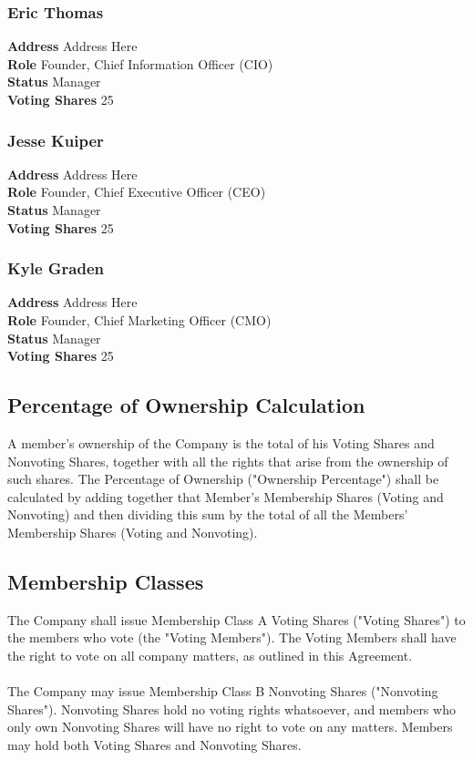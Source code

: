 \documentclass[11pt]{article}
\begin{document}
\subsubsection{Eric Thomas}
\textbf{Address} Address Here\\
\textbf{Role} Founder, Chief Information Officer (CIO)\\
\textbf{Status} Manager \\
\textbf{Voting Shares} 25

\subsubsection{Jesse Kuiper}
\textbf{Address} Address Here\\
\textbf{Role} Founder, Chief Executive Officer (CEO)\\
\textbf{Status} Manager \\
\textbf{Voting Shares} 25

\subsubsection{Kyle Graden}
\textbf{Address} Address Here\\
\textbf{Role} Founder, Chief Marketing Officer (CMO)\\
\textbf{Status} Manager \\
\textbf{Voting Shares} 25

\subsection{Percentage of Ownership Calculation}
A member's ownership of the Company is the total of his Voting Shares and Nonvoting Shares, together with all the rights that arise from the ownership of such shares. The Percentage of Ownership ("Ownership Percentage") shall be calculated by adding together that Member's Membership Shares (Voting and Nonvoting) and then dividing this sum by the total of all the Members' Membership Shares (Voting and Nonvoting).

\subsection{Membership Classes}
\label{sec:membershipClasses}
The Company shall issue Membership Class A Voting Shares ("Voting Shares") to the members who vote (the "Voting Members"). The Voting Members shall have the right to vote on all company matters, as outlined in this Agreement.\\\\
The Company may issue Membership Class B Nonvoting Shares ("Nonvoting Shares"). Nonvoting Shares hold no voting rights whatsoever, and members who only own Nonvoting Shares will have no right to vote on any matters. Members may hold both Voting Shares and Nonvoting Shares.
\end{document}

